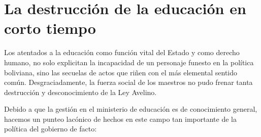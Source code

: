 \documentclass[a4paper, nobind]{templates/ociamthesis}
\begin{document}
\hypertarget{la-destrucciuxf3n-de-la-educaciuxf3n-en-corto-tiempo}{%
\chapter{La destrucción de la educación en corto tiempo}\label{la-destrucciuxf3n-de-la-educaciuxf3n-en-corto-tiempo}}

Los atentados a la educación como función vital del Estado y como derecho humano, no solo explicitan la incapacidad de un personaje funesto en la política boliviana, sino las secuelas de actos que riñen con el más elemental sentido común. Desgraciadamente, la fuerza social de los maestros no pudo frenar tanta destrucción y desconocimiento de la Ley Avelino.

Debido a que la gestión en el ministerio de educación es de conocimiento general, hacemos un punteo lacónico de hechos en este campo tan importante de la política del gobierno de facto:
\end{document}
